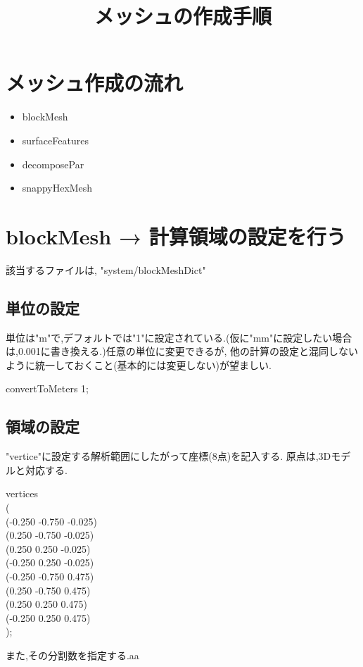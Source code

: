 \documentclass[a4paper]{jsarticle}
\author{}
\title{メッシュの作成手順}
\date{}
\begin{document}
\maketitle
\section{\large メッシュ作成の流れ}
\begin{itemize}
    \item blockMesh
    \item surfaceFeatures
    \item decomposePar
    \item snappyHexMesh
\end{itemize}
\section{\large blockMesh → 計算領域の設定を行う}
該当するファイルは, "system/blockMeshDict"
\subsection{単位の設定}
単位は"m"で,デフォルトでは"1"に設定されている.(仮に"mm"に設定したい場合は,0.001に書き換える.)任意の単位に変更できるが,
他の計算の設定と混同しないように統一しておくこと(基本的には変更しない)が望ましい.
\begin{framed}
    \begin{center}
        convertToMeters 1;
    \end{center}
\end{framed}
\subsection{領域の設定}
"vertice"に設定する解析範囲にしたがって座標(8点)を記入する.
原点は,3Dモデルと対応する.
\begin{framed}
    \begin{center}
        {
            vertices\\
            (\\
            \qquad (-0.250 -0.750 -0.025)\\
            \qquad (0.250 -0.750 -0.025)\\
            \qquad (0.250 0.250 -0.025)\\
            \qquad (-0.250 0.250 -0.025)\\
            \qquad (-0.250 -0.750 0.475)\\
            \qquad (0.250 -0.750 0.475)\\
            \qquad (0.250 0.250 0.475)\\
            \qquad (-0.250 0.250 0.475)\\
            );
        }
    \end{center}
\end{framed}

また,その分割数を指定する.aa
\end{document}
